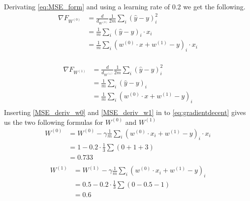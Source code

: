 \noindent Derivating \ref{eq:MSE_form} and using a learning rate of 0.2 we get the following. 
\begin{equation}
    \label{MSE_deriv_w0}
    \begin{split}
    \nabla F_{W^{(0)}} &= \frac{d}{d_{W^{(0)}} } \frac{1}{2m} \sum_i (\hat{y}-y)_i^2 \\
     &= \frac{1}{m} \sum_{i}{(\hat{y}-y)}_{i} \cdot x_i\\
     &= \frac{1}{m} \sum_{i}{(w^{(0)} \cdot x + w^{(1)}-y)}_{i} \cdot x_i\\
    \end{split}
\end{equation}

\begin{equation}
    \label{MSE_deriv_w1}
    \begin{split}
     \nabla F_{W^{(1)}} &= \frac{d}{d_{W^{(1)}} } \frac{1}{2m} \sum_i (\hat{y}-y)_i^2 \\
                    &= \frac{1}{m} \sum_{i}{(\hat{y}-y)}_{i} \\
                    &= \frac{1}{m} \sum_{i}{(w^{(0)} \cdot x + w^{(1)}-y)}_{i}\\
    \end{split}
\end{equation}
\noindent Inserting \ref{MSE_deriv_w0} and \ref{MSE_deriv_w1} in to \ref{eq:gradientdecent} gives us the two following formulas for $W^{(0)}$ and $W^{(1)}$
\begin{equation}
    \label{GD_W0}
    \begin{split}
    W^{(0)}  &= W^{(0)} - \gamma \frac{1}{m} \sum_{i}{(w^{(0)} \cdot x_i + w^{(1)}-y)}_{i} \cdot x_i \\
              &= 1 - 0.2 \cdot \frac{1}{3}  \sum (0+1+3)  \\
              &= 0.733\\
    \end{split}
\end{equation}
\begin{equation}
    \label{GD_W0}
    \begin{split}
    W^{(1)}  &= W^{(1)} - \gamma \frac{1}{m} \sum_{i}{(w^{(0)} \cdot x_i + w^{(1)}-y)}_{i} \\
              &= 0.5 - 0.2 \cdot \frac{1}{3} \sum (0-0.5-1) \\
              &= 0.6\\
    \end{split}
\end{equation}

